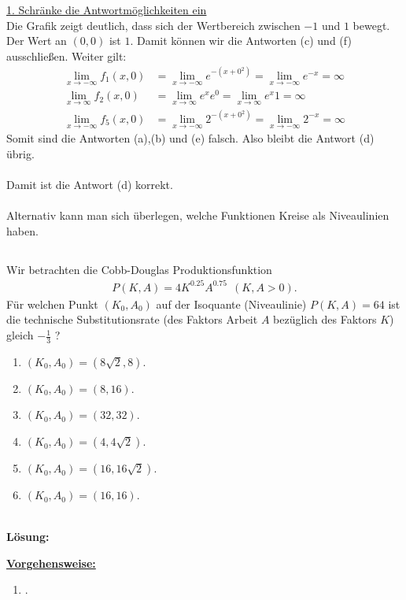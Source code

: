 \underline{1. Schränke die Antwortmöglichkeiten ein}\\
Die Grafik zeigt deutlich, dass sich der Wertbereich zwischen $ -1 $ und $ 1 $ bewegt. Der Wert an $ (0,0) $ ist $ 1 $.
Damit können wir die Antworten (c) und (f) ausschließen.
Weiter gilt:
\begin{align*}
	\lim \limits_{x \to -\infty}
	f_1(x,0) 
	&=
	\lim \limits_{x \to -\infty} e^{-(x +0^2)} 
	= 
	\lim \limits_{x \to -\infty} e^{-x} = \infty\\
	\lim \limits_{x \to \infty}
	f_2(x,0) 
	&=
	\lim \limits_{x \to \infty}
	e^x e^0 
	=
	\lim \limits_{x \to \infty}
	e^x 1 
	=
	\infty\\
		\lim \limits_{x \to -\infty}
	f_5(x,0) 
	&=
	\lim \limits_{x \to -\infty} 2^{-(x +0^2)} 
	= 
	\lim \limits_{x \to -\infty} 2^{-x} = \infty
\end{align*}
Somit sind die Antworten (a),(b) und (e) falsch. Also bleibt die Antwort (d) übrig.\\
\\
Damit ist die Antwort (d) korrekt.
\\
\\
Alternativ kann man sich überlegen, welche Funktionen Kreise als Niveaulinien haben.


\newpage

\subsection*{}
Wir betrachten die Cobb-Douglas Produktionsfunktion
\begin{align*}
	P(K,A) 
	=
	4 K^{0.25} A^{0.75} \ \ (K,A > 0).
\end{align*}
Für welchen Punkt $ (K_0, A_0) $ auf der Isoquante (Niveaulinie) $ P(K,A) = 64 $ ist die technische Substitutionsrate (des Faktors Arbeit $ A $ bezüglich des Faktors $ K $) gleich $ - \frac{1}{3} $ ?
\renewcommand{\labelenumi}{(\alph{enumi})}
\begin{enumerate}
	\item 
	$ (K_0, A_0) = ( 8 \sqrt{2}, 8 ) $.
	\item
	$ (K_0, A_0) = ( 8 , 16 )$.
	\item
	$ (K_0, A_0) = ( 32 , 32)$.
	\item
	$ (K_0, A_0) = ( 4 , 4\sqrt{2})$.
	\item
	$ (K_0, A_0) = ( 16 , 16\sqrt{2})$.
	\item
	$ (K_0, A_0) = ( 16 , 16)$.
\end{enumerate}
\ \\
\textbf{Lösung:}
\begin{mdframed}
\underline{\textbf{Vorgehensweise:}}
\renewcommand{\labelenumi}{\theenumi.}
\begin{enumerate}
\item .
\end{enumerate}
\end{mdframed}

